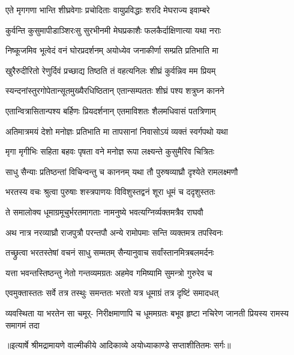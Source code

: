 \twolineshloka
{एते मृगगणा भान्ति शीघ्रवेगाः प्रचोदिताः}
{वायुप्रविद्धाः शरदि मेघराज्य इवाम्बरे} %

\twolineshloka
{कुर्वन्ति कुसुमापीडाञ्शिरःसु सुरभीनमी}
{मेघप्रकाशैः फलकैर्दाक्षिणात्या यथा नराः} %

\twolineshloka
{निष्कूजमिव भूत्वेदं वनं घोरप्रदर्शनम्}
{अयोध्येव जनाकीर्णा सम्प्रति प्रतिभाति मा} %

\twolineshloka
{खुरैरुदीरितो रेणुर्दिवं प्रच्छाद्य तिष्ठति}
{तं वहत्यनिलः शीघ्रं कुर्वन्निव मम प्रियम्} %

\twolineshloka
{स्यन्दनांस्तुरगोपेतान्सूतमुख्यैरधिष्ठितान्}
{एतान्सम्पततः शीघ्रं पश्य शत्रुघ्न कानने} %

\twolineshloka
{एतान्वित्रासितान्पश्य बर्हिणः प्रियदर्शनान्}
{एतमाविशतः शैलमधिवासं पतत्रिणाम्} %

\twolineshloka
{अतिमात्रमयं देशो मनोज्ञः प्रतिभाति मा}
{तापसानां निवासोऽयं व्यक्तं स्वर्गपथो यथा} %

\twolineshloka
{मृगा मृगीभिः सहिता बहवः पृषता वने}
{मनोज्ञ रूपा लक्ष्यन्ते कुसुमैरिव चित्रितः} %

\twolineshloka
{साधु सैन्याः प्रतिष्ठन्तां विचिन्वन्तु च काननम्}
{यथा तौ पुरुषव्याघ्रौ दृश्येते रामलक्ष्मणौ} %

\twolineshloka
{भरतस्य वचः श्रुत्वा पुरुषाः शस्त्रपाणयः}
{विविशुस्तद्वनं शूरा धूमं च ददृशुस्ततः} %

\twolineshloka
{ते समालोक्य धूमाग्रमूचुर्भरतमागताः}
{नामनुष्ये भवत्यग्निर्व्यक्तमत्रैव राघवौ} %

\twolineshloka
{अथ नात्र नरव्याघ्रौ राजपुत्रौ परन्तपौ}
{अन्ये रामोपमाः सन्ति व्यक्तमत्र तपस्विनः} %

\twolineshloka
{तच्छ्रुत्वा भरतस्तेषां वचनं साधु सम्मतम्}
{सैन्यानुवाच सर्वांस्तानमित्रबलमर्दनः} %

\twolineshloka
{यत्ता भवन्तस्तिष्ठन्तु नेतो गन्तव्यमग्रतः}
{अहमेव गमिष्यामि सुमन्त्रो गुरुरेव च} %

\twolineshloka
{एवमुक्तास्ततः सर्वे तत्र तस्थुः समन्ततः}
{भरतो यत्र धूमाग्रं तत्र दृष्टिं समादधत्} %

\fourlineindentedshloka
{व्यवस्थिता या भरतेन सा चमूर्-}
{निरीक्षमाणापि च धूममग्रतः}
{बभूव हृष्टा नचिरेण जानती}
{प्रियस्य रामस्य समागमं तदा} %


{॥इत्यार्षे श्रीमद्रामायणे वाल्मीकीये आदिकाव्ये अयोध्याकाण्डे सप्ताशीतितमः सर्गः॥}

